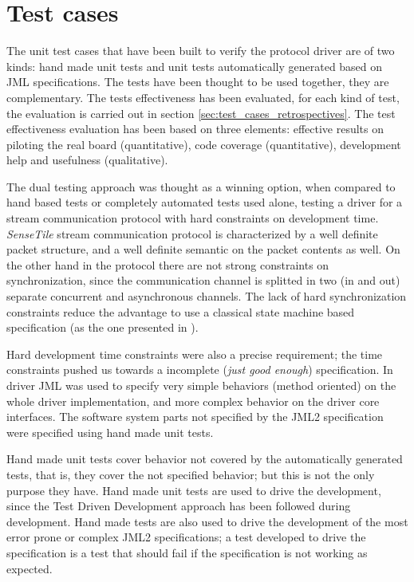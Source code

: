 \documentclass{article} \usepackage{times}
\newcommand{\ST}{\emph{SenseTile}\xspace}
\begin{document}
\section{Test cases}
\label{sec:test_cases}

The unit test cases that have been built to verify the protocol driver
are of two kinds: hand made unit tests and unit tests automatically
generated based on JML specifications.  The tests have been thought to
be used together, they are complementary.  The tests effectiveness has
been evaluated, for each kind of test, the evaluation is carried out
in section \ref{sec:test_cases_retrospectives}.  The test
effectiveness evaluation has been based on three elements: effective
results on piloting the real board (quantitative), code coverage
(quantitative), development help and usefulness (qualitative).

The dual testing approach was thought as a winning option, when
compared to hand based tests or completely automated tests used alone,
testing a driver for a stream communication protocol with hard
constraints on development time.  \ST stream communication protocol is
characterized by a well definite packet structure, and a well definite
semantic on the packet contents as well.  On the other hand in the
protocol there are not strong constraints on synchronization, since
the communication channel is splitted in two (in and out) separate
concurrent and asynchronous channels.  The lack of hard
synchronization constraints reduce the advantage to use a classical
state machine based specification (as the one presented in
\cite{Hubbers2004}).

Hard development time constraints were also a precise requirement; the
time constraints pushed us towards a incomplete (\emph{just good
  enough}) specification.  In \STSB driver JML was used to specify
very simple behaviors (method oriented) on the whole driver
implementation, and more complex behavior on the driver core
interfaces.  The software system parts not specified by the JML2
specification were specified using hand made unit tests.

Hand made unit tests cover behavior not covered by the automatically
generated tests, that is, they cover the not specified behavior; but
this is not the only purpose they have.  Hand made unit tests are used
to drive the development, since the Test Driven Development
approach\cite{beck2003test} has been followed during development.
Hand made tests are also used to drive the development of the most
error prone or complex JML2 specifications; a test developed to drive
the specification is a test that should fail if the specification is
not working as expected.
\end{document}
